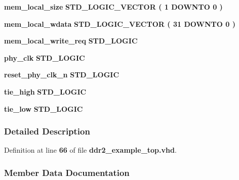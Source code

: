\begin{DoxyCompactItemize}
\item 
{\bf mem\+\_\+local\+\_\+size} {\bfseries \textcolor{comment}{S\+T\+D\+\_\+\+L\+O\+G\+I\+C\+\_\+\+V\+E\+C\+T\+OR}\textcolor{vhdlchar}{ }\textcolor{vhdlchar}{(}\textcolor{vhdlchar}{ }\textcolor{vhdlchar}{ } \textcolor{vhdldigit}{1} \textcolor{vhdlchar}{ }\textcolor{keywordflow}{D\+O\+W\+N\+TO}\textcolor{vhdlchar}{ }\textcolor{vhdlchar}{ } \textcolor{vhdldigit}{0} \textcolor{vhdlchar}{ }\textcolor{vhdlchar}{)}\textcolor{vhdlchar}{ }} 
\item 
{\bf mem\+\_\+local\+\_\+wdata} {\bfseries \textcolor{comment}{S\+T\+D\+\_\+\+L\+O\+G\+I\+C\+\_\+\+V\+E\+C\+T\+OR}\textcolor{vhdlchar}{ }\textcolor{vhdlchar}{(}\textcolor{vhdlchar}{ }\textcolor{vhdlchar}{ } \textcolor{vhdldigit}{31} \textcolor{vhdlchar}{ }\textcolor{keywordflow}{D\+O\+W\+N\+TO}\textcolor{vhdlchar}{ }\textcolor{vhdlchar}{ } \textcolor{vhdldigit}{0} \textcolor{vhdlchar}{ }\textcolor{vhdlchar}{)}\textcolor{vhdlchar}{ }} 
\item 
{\bf mem\+\_\+local\+\_\+write\+\_\+req} {\bfseries \textcolor{comment}{S\+T\+D\+\_\+\+L\+O\+G\+IC}\textcolor{vhdlchar}{ }} 
\item 
{\bf phy\+\_\+clk} {\bfseries \textcolor{comment}{S\+T\+D\+\_\+\+L\+O\+G\+IC}\textcolor{vhdlchar}{ }} 
\item 
{\bf reset\+\_\+phy\+\_\+clk\+\_\+n} {\bfseries \textcolor{comment}{S\+T\+D\+\_\+\+L\+O\+G\+IC}\textcolor{vhdlchar}{ }} 
\item 
{\bf tie\+\_\+high} {\bfseries \textcolor{comment}{S\+T\+D\+\_\+\+L\+O\+G\+IC}\textcolor{vhdlchar}{ }} 
\item 
{\bf tie\+\_\+low} {\bfseries \textcolor{comment}{S\+T\+D\+\_\+\+L\+O\+G\+IC}\textcolor{vhdlchar}{ }} 
\end{DoxyCompactItemize}


\subsubsection{Detailed Description}


Definition at line {\bf 66} of file {\bf ddr2\+\_\+example\+\_\+top.\+vhd}.



\subsubsection{Member Data Documentation}
